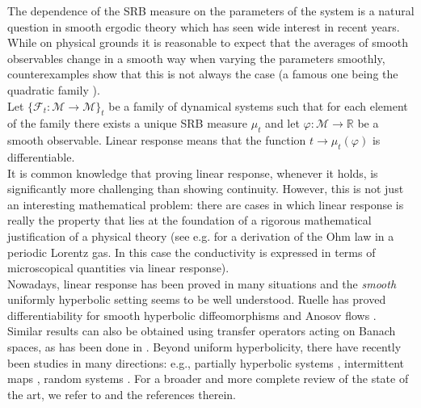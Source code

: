 \documentclass{amsart}
\numberwithin{equation}{section}
\newcommand\vf{\varphi}
\newcommand\cF{{\mathcal F}}
\newcommand\cM{{\mathcal M}}
\newcommand\bR{{\mathbb R}}
\begin{document}
The dependence of the SRB measure on the parameters of the system is a natural question in smooth ergodic theory which has seen wide interest in recent years. While on physical grounds it is reasonable to expect that the averages of smooth observables change in a smooth way when varying the parameters smoothly, counterexamples show that this is not always the case (a famous one being the quadratic family \cite{BBS15}).\\
Let \(\{\cF_{t}: \cM \to \cM\}_t\) be a family of dynamical systems such that for each element of the family there exists a unique SRB measure \(\mu_t\) and let \(\vf: \cM \to \bR\) be a smooth observable. Linear response means that the function \(t \to \mu_{t}(\vf)\) is differentiable.\\
It is common knowledge that proving linear response, whenever it holds, is significantly more challenging than showing continuity. However, this is not just an interesting mathematical problem: there are cases in which linear response is really the property that lies at the foundation of a rigorous mathematical justification of a physical theory (see e.g. \cite{CELS93, BDL00} for a derivation of the Ohm law in a periodic Lorentz gas. In this case the conductivity is expressed in terms of microscopical quantities via linear response).\\
Nowadays, linear response has been proved in many situations and the \textit{smooth} uniformly hyperbolic setting seems to be well understood. Ruelle has proved differentiability for smooth hyperbolic diffeomorphisms \cite{Ruelle97, Ruelle04} and Anosov flows \cite{Ruelle08}. Similar results can also be obtained using transfer operators acting on Banach spaces, as has been done in \cite{BL07}. Beyond uniform hyperbolicity, there have recently been studies in many directions: e.g., partially hyperbolic systems \cite{Dolgopyat04}, intermittent maps \cite{BT16, Korepanov}, random systems \cite{BRS20}. For a broader and more complete review of the state of the art, we refer to \cite{Baladi14,Ruelle09} and the references therein.
\end{document}
